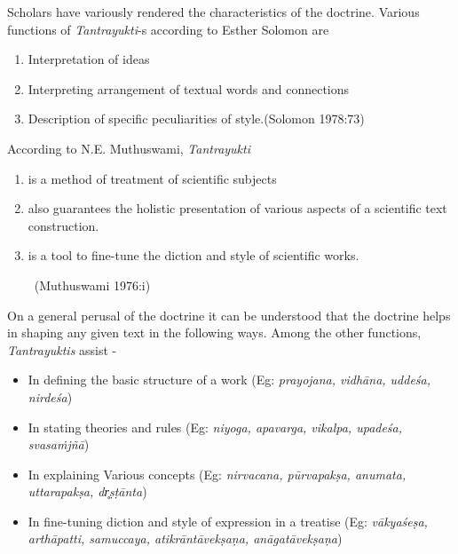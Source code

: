 Scholars have variously rendered the characteristics of the doctrine. Various functions of \textit{Tantrayukti}-s according to Esther Solomon are

\begin{enumerate}[{\rm a.}]
\itemsep=0pt
\item Interpretation of ideas

 \item Interpreting arrangement of textual words and connections

 \item Description of specific peculiarities of style.\hfill (Solomon 1978:73)

\end{enumerate}

According to N.E. Muthuswami, \textit{Tantrayukti}

\begin{enumerate}[{\rm i)}]
\itemsep=0pt
\item is a method of treatment of scientific subjects

 \item also guarantees the holistic presentation of various aspects of a scientific text construction.

 \item is a tool to fine-tune the diction and style of scientific works.

~\hfill (Muthuswami 1976:i)

\end{enumerate}

On a general perusal of the doctrine it can be understood that the doctrine helps in shaping any given text in the following ways. Among the other functions, \textit{Tantrayuktis} assist -

\begin{itemize}
\item In defining the basic structure of a work (Eg: \textit{prayojana, vidhāna, uddeśa, nirdeśa})

 \item In stating theories and rules (Eg: \textit{niyoga, apavarga, vikalpa, upadeśa, svasaṁjñā})

 \item In explaining Various concepts (Eg: \textit{nirvacana, pūrvapakṣa, anumata, uttarapakṣa, dr̥ṣṭānta})

 \item In fine-tuning diction and style of expression in a treatise (Eg: \textit{vākyaśeṣa, arthāpatti, samuccaya, atikrāntāvekṣaṇa, anāgatāvekṣaṇa})

\end{itemize}

